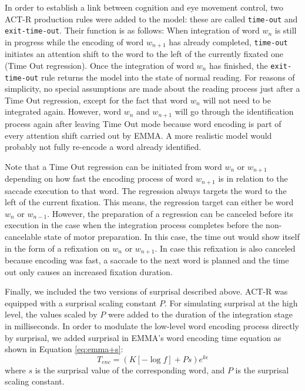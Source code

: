 In order to establish a link between cognition and eye movement control, two ACT-R production rules were added to the model: these are called \texttt{time-out} and  \texttt{exit-time-out}.  Their function is as follows: When integration of word $w_n$ is still in progress while the encoding of word $w_{n+1}$ has already completed, \texttt{time-out} initiates an attention shift to the word to the left of the currently fixated one  (Time Out regression).  Once the integration of word $w_n$ has finished, the \texttt{exit-time-out} rule returns the model into the state of normal reading.
For reasons of simplicity, no special assumptions are made about the reading process just after a Time Out regression, except for the fact that word $w_n$ will not need to be integrated again.  However, word $w_{n}$ and $w_{n+1}$ will go through the identification process again after leaving Time Out mode because word encoding is part of every attention shift carried out by EMMA.  A more realistic model would probably not fully re-encode a word already identified.  

Note that a Time Out regression can be initiated from word $w_{n}$ or $w_{n+1}$ depending on how fast the encoding process of word $w_{n+1}$ is in relation to the saccade execution to that word.  The regression always targets the word to the left of the current fixation.  This means, the regression target can either be word $w_{n}$ or  $w_{n-1}$.  However, the preparation of a regression can be canceled before its execution in the case when the integration process completes before the non-cancelable state of motor preparation.  In this case, the time out would show itself in the form of a refixation on $w_{n}$ or $w_{n+1}$.  In case this refixation is also canceled because encoding was fast, a saccade to the next word is planned and the time out only causes an increased fixation duration.

Finally, we included the two versions of surprisal described above.  ACT-R was equipped with a surprisal scaling constant $P$. 
For simulating surprisal at the high level, the values scaled by $P$ were added to the duration of the integration stage in milliseconds.  In order to modulate the low-level word encoding process directly by surprisal, we added surprisal in EMMA's word encoding time equation as shown in Equation \ref{eq:emma+s}:
\begin{equation}
T_{enc} = (K [-\log{f}] + Ps)e^{k\epsilon}
\label{eq:emma+s}
\end{equation}
where $s$ is the surprisal value of the corresponding word, and $P$ is the surprisal scaling constant.

